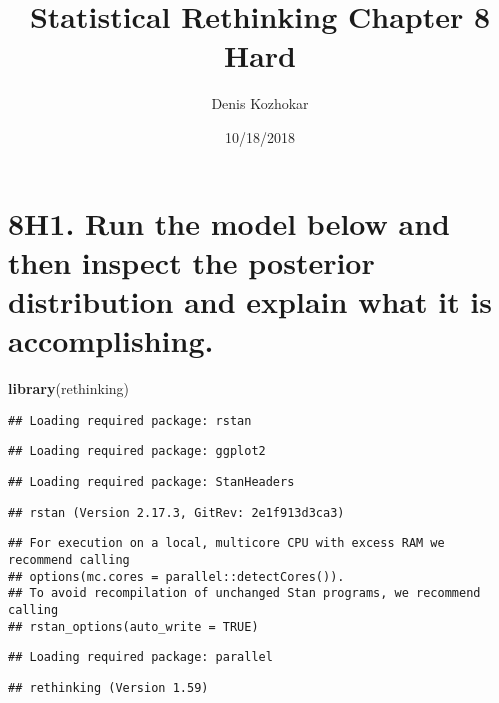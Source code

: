 \documentclass[]{article}
\title{Statistical Rethinking Chapter 8 Hard}
\author{Denis Kozhokar}
\date{10/18/2018}
\newenvironment{Shaded}{\begin{snugshade}}{\end{snugshade}}
\newcommand{\KeywordTok}[1]{\textcolor[rgb]{0.13,0.29,0.53}{\textbf{#1}}}
\newcommand{\NormalTok}[1]{#1}
\begin{document}
\maketitle

\section{8H1. Run the model below and then inspect the posterior
distribution and explain what it is
accomplishing.}\label{h1.-run-the-model-below-and-then-inspect-the-posterior-distribution-and-explain-what-it-is-accomplishing.}

\begin{Shaded}
\begin{Highlighting}[]
\KeywordTok{library}\NormalTok{(rethinking)}
\end{Highlighting}
\end{Shaded}

\begin{verbatim}
## Loading required package: rstan
\end{verbatim}

\begin{verbatim}
## Loading required package: ggplot2
\end{verbatim}

\begin{verbatim}
## Loading required package: StanHeaders
\end{verbatim}

\begin{verbatim}
## rstan (Version 2.17.3, GitRev: 2e1f913d3ca3)
\end{verbatim}

\begin{verbatim}
## For execution on a local, multicore CPU with excess RAM we recommend calling
## options(mc.cores = parallel::detectCores()).
## To avoid recompilation of unchanged Stan programs, we recommend calling
## rstan_options(auto_write = TRUE)
\end{verbatim}

\begin{verbatim}
## Loading required package: parallel
\end{verbatim}

\begin{verbatim}
## rethinking (Version 1.59)
\end{verbatim}
\end{document}
